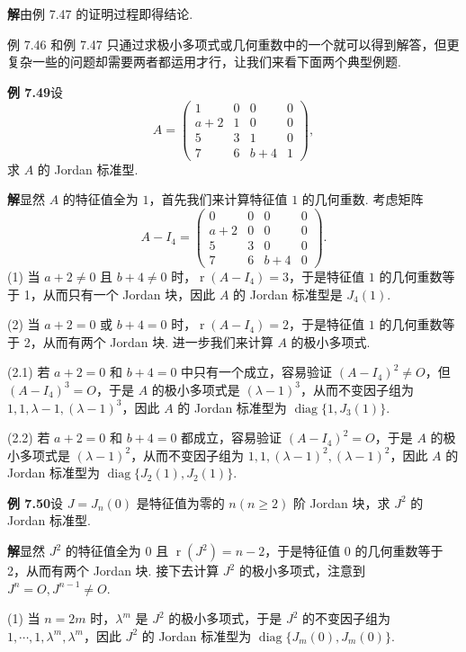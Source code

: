 \documentclass[UTF8, 12pt, fontset=fandol, oneside]{ctexart}
\begin{document}
\noindent\textbf{解}\quad 由例 7.47 的证明过程即得结论.

例 7.46 和例 7.47 只通过求极小多项式或几何重数中的一个就可以得到解答，但更复杂一些的问题却需要两者都运用才行，让我们来看下面两个典型例题.

\noindent\textbf{例 7.49}\quad 设
\[
A=\left(\begin{array}{cccc}
1 & 0 & 0 & 0\\
a+2 & 1 & 0 & 0\\
5 & 3 & 1 & 0\\
7 & 6 & b+4 & 1
\end{array}\right),
\]
求 $A$ 的 Jordan 标准型.

\noindent\textbf{解}\quad 显然 $A$ 的特征值全为 $1$，首先我们来计算特征值 $1$ 的几何重数. 考虑矩阵
\[
A-I_4=
\left(\begin{array}{cccc}
0 & 0 & 0 & 0\\
a+2 & 0 & 0 & 0\\
5 & 3 & 0 & 0\\
7 & 6 & b+4 & 0
\end{array}\right).
\]
(1) 当 $a+2\ne 0$ 且 $b+4\ne 0$ 时，$\operatorname{r}(A-I_4)=3$，于是特征值 $1$ 的几何重数等于 1，从而只有一个 Jordan 块，因此 $A$ 的 Jordan 标准型是 $J_4(1)$.

(2) 当 $a+2=0$ 或 $b+4=0$ 时，$\operatorname{r}(A-I_4)=2$，于是特征值 $1$ 的几何重数等于 2，从而有两个 Jordan 块. 进一步我们来计算 $A$ 的极小多项式.

(2.1) 若 $a+2=0$ 和 $b+4=0$ 中只有一个成立，容易验证 $(A-I_4)^2\ne O$，但 $(A-I_4)^3=O$，于是 $A$ 的极小多项式是 $(\lambda-1)^3$，从而不变因子组为 $1,1,\lambda-1,(\lambda-1)^3$，因此 $A$ 的 Jordan 标准型为 $\operatorname{diag}\{1,J_3(1)\}$.

(2.2) 若 $a+2=0$ 和 $b+4=0$ 都成立，容易验证 $(A-I_4)^2=O$，于是 $A$ 的极小多项式是 $(\lambda-1)^2$，从而不变因子组为 $1,1,(\lambda-1)^2,(\lambda-1)^2$，因此 $A$ 的 Jordan 标准型为 $\operatorname{diag}\{J_2(1),J_2(1)\}$.

\noindent\textbf{例 7.50}\quad 设 $J=J_n(0)$ 是特征值为零的 $n(n\ge 2)$ 阶 Jordan 块，求 $J^2$ 的 Jordan 标准型.

\noindent\textbf{解}\quad 显然 $J^2$ 的特征值全为 0 且 $\operatorname{r}(J^2)=n-2$，于是特征值 0 的几何重数等于 2，从而有两个 Jordan 块. 接下去计算 $J^2$ 的极小多项式，注意到 $J^n=O,J^{n-1}\ne O$.

(1) 当 $n=2m$ 时，$\lambda^m$ 是 $J^2$ 的极小多项式，于是 $J^2$ 的不变因子组为 $1,\cdots,1,\lambda^m,\lambda^m$，因此 $J^2$ 的 Jordan 标准型为 $\operatorname{diag}\{J_m(0),J_m(0)\}$.
\end{document}
